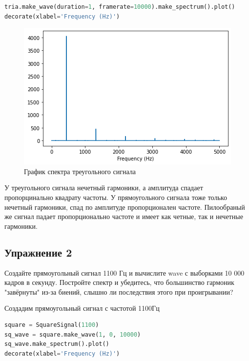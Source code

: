 \begin{lstlisting}[language=Python]
tria.make_wave(duration=1, framerate=10000).make_spectrum().plot()
decorate(xlabel='Frequency (Hz)')
\end{lstlisting}

\begin{figure}[H]
	\begin{center}
		\includegraphics[scale=1]{fig/lab02/lab02_06.png}
		\caption{График спектра треугольного сигнала}
	\end{center}
\end{figure}

У треугольного сигнала нечетный гармоники, а амплитуда спадает пропорцинально квадрату частоты. У прямоугольного сигнала тоже только нечетный гармоники, спад по амплитуде пропорционален частоте. Пилообраный же сигнал падает пропорционально частоте и имеет как четные, так и нечетные гармоники.


\subsection{Упражнение 2}

Создайте прямоугольный сигнал 1100 Гц и вычислите wave с выборками 10 000 кадров в секунду. Постройте спектр и убедитесь, что большинство гармоник "завёрнуты" из-за биений, слышно ли последствия этого при проигрывании?

Создадим прямоугольный сигнал с частотой 1100Гц

\begin{lstlisting}[language=Python]
square = SquareSignal(1100)
sq_wave = square.make_wave(1, 0, 10000)
sq_wave.make_spectrum().plot()
decorate(xlabel='Frequency (Hz)')
\end{lstlisting}


